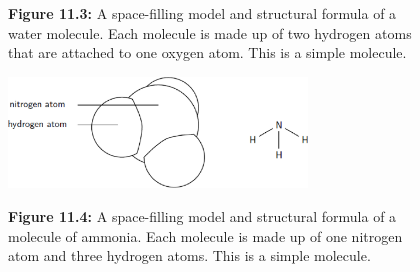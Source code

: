 \begin{enumerate}[noitemsep, label=\textbf{\arabic*}. ]
\begin{itemize}[noitemsep]
\begin{figure}[H]
\begin{center}
      \vspace{2pt}
    \vspace{\rubberspace}\par \begin{cnxcaption}
	  \small \textbf{Figure 11.3: }A space-filling model and structural 
formula of a water molecule. Each molecule is made up of two hydrogen atoms that 
are attached to one oxygen atom. This is a simple molecule.
	\end{cnxcaption}
      
    \vspace{.1in}
    
    \end{center}

 \end{figure}   

    \addtocounter{footnote}{-0}
    

    \setcounter{subfigure}{0}


	\begin{figure}[H] %
    \begin{center}
    \label{m38120*uid9!!!underscore!!!media}\label{m38120*uid9!!!underscore!!!printimage}\includegraphics[width=300px]{col11305.imgs/m38120_CG10C2_004.png} %
        
      \vspace{2pt}
    \vspace{\rubberspace}\par \begin{cnxcaption}
	  \small \textbf{Figure 11.4: }A space-filling model and structural 
formula of a molecule of ammonia. Each molecule is made up of one nitrogen atom 
and three hydrogen atoms. This is a simple molecule.
	\end{cnxcaption}
      
    \vspace{.1in}
    
    \end{center}

 \end{figure}   

    \addtocounter{footnote}{-0}
    \end{itemize}
        

\end{enumerate}
